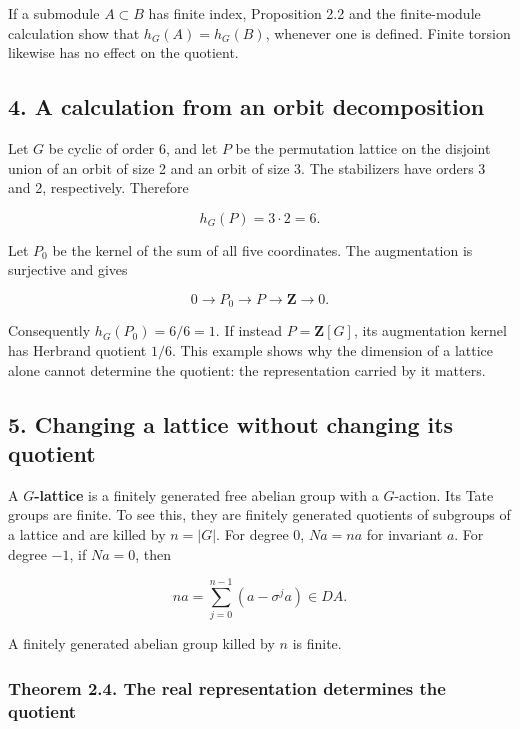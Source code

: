 \documentclass[11pt,a4paper]{article}
\begin{document}
If a submodule \(A\subset B\) has finite index, Proposition 2.2 and the
finite-module calculation show that \(h_G(A)=h_G(B)\), whenever one is
defined. Finite torsion likewise has no effect on the quotient.

\subsection{4. A calculation from an orbit
decomposition}\label{a-calculation-from-an-orbit-decomposition}

Let \(G\) be cyclic of order 6, and let \(P\) be the permutation lattice
on the disjoint union of an orbit of size 2 and an orbit of size 3. The
stabilizers have orders 3 and 2, respectively. Therefore

\[
h_G(P)=3\cdot2=6.
\]

Let \(P_0\) be the kernel of the sum of all five coordinates. The
augmentation is surjective and gives

\[
0\longrightarrow P_0\longrightarrow P\longrightarrow\mathbf Z\longrightarrow0.
\]

Consequently \(h_G(P_0)=6/6=1\). If instead \(P=\mathbf Z[G]\), its
augmentation kernel has Herbrand quotient \(1/6\). This example shows
why the dimension of a lattice alone cannot determine the quotient: the
representation carried by it matters.

\subsection{5. Changing a lattice without changing its
quotient}\label{changing-a-lattice-without-changing-its-quotient}

A \textbf{\(G\)-lattice} is a finitely generated free abelian group with
a \(G\)-action. Its Tate groups are finite. To see this, they are
finitely generated quotients of subgroups of a lattice and are killed by
\(n=|G|\). For degree 0, \(Na=na\) for invariant \(a\). For degree
\(-1\), if \(Na=0\), then

\[
na=\sum_{j=0}^{n-1}(a-\sigma^j a)\in DA.
\]

A finitely generated abelian group killed by \(n\) is finite.

\subsubsection{Theorem 2.4. The real representation determines the
quotient}\label{theorem-2.4.-the-real-representation-determines-the-quotient}
\end{document}
